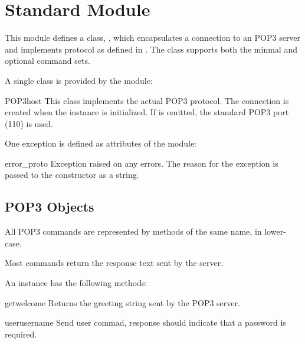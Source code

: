 
\section{Standard Module }
\label{module-poplib}

This module defines a class, , which encapsulates a
connection to an POP3 server and implements protocol as defined in
.  The  class supports both the minmal and
optional command sets.

A single class is provided by the  module:

\begin{classdesc}{POP3}{host}
This class implements the actual POP3 protocol.  The connection is
created when the instance is initialized.
If  is omitted, the standard POP3 port (110) is used.
\end{classdesc}

One exception is defined as attributes of the  module:

\begin{excdesc}{error_proto}
Exception raised on any errors.  The reason for the exception is
passed to the constructor as a string.
\end{excdesc}


\subsection{POP3 Objects}
\label{pop3-objects}

All POP3 commands are represented by methods of the same name,
in lower-case.

Most commands return the response text sent by the server.

An  instance has the following methods:


\begin{methoddesc}{getwelcome}{}
Returns the greeting string sent by the POP3 server.
\end{methoddesc}


\begin{methoddesc}{user}{username}
Send user commad, response should indicate that a password is required.
\end{methoddesc}

